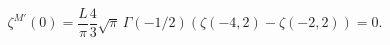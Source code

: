 \begin{equation}
\label{1bravac}
\zeta^{M\prime}(0)=\frac{L}{\pi}\frac 4 3 \sqrt{\pi}\,\Gamma(-1/2)
\left(\zeta(-4,2)-\zeta(-2,2)\right)=0.
\end{equation}


